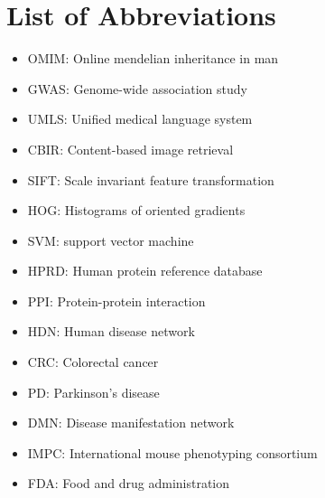 \newpage
\section*{List of Abbreviations}
\begin{itemize}
  \item OMIM: Online \lowercase{Mendelian Inheritance in Man}
  \item GWAS: Genome-wide association study
  \item UMLS: Unified \lowercase{Medical Language System}
  \item CBIR: Content-based image retrieval
  \item SIFT: Scale invariant feature transformation
  \item HOG: Histograms of oriented gradients
  \item SVM: support vector machine
  \item HPRD: Human \lowercase{Protein Reference Database}
  \item PPI: Protein-protein interaction
  \item HDN: Human disease network
  \item CRC: Colorectal cancer
  \item PD: Parkinson's disease
  \item DMN: Disease manifestation network
  \item IMPC: International \lowercase{Mouse Phenotyping Consortium}
  \item FDA: Food and drug administration

\end{itemize}